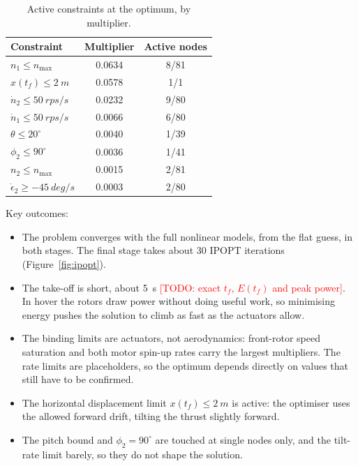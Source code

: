 \documentclass[11pt,a4paper]{article}
\newcommand{\todo}[1]{\textcolor{red}{[TODO: #1]}}
\begin{document}
\begin{table}[h]
\centering\small
\begin{tabular}{@{}lcc@{}}
\toprule
Constraint & Multiplier & Active nodes \\
\midrule
$n_1 \le n_\text{max}$                  & 0.0634   & 8/81 \\
$x(t_f) \le \SI{2}{m}$                  & 0.0578   & 1/1 \\
$\dot n_2 \le \SI{50}{rps/s}$           & 0.0232   & 9/80 \\
$\dot n_1 \le \SI{50}{rps/s}$           & 0.0066   & 6/80 \\
$\theta \le 20^\circ$                   & 0.0040   & 1/39 \\
$\phi_2 \le 90^\circ$                   & 0.0036   & 1/41 \\
$n_2 \le n_\text{max}$                  & 0.0015   & 2/81 \\
$\dot\epsilon_2 \ge -\SI{45}{deg/s}$    & 0.0003   & 2/80 \\
\bottomrule
\end{tabular}
\caption{Active constraints at the optimum, by multiplier.}
\label{tab:active}
\end{table}

Key outcomes:
\begin{itemize}
  \item The problem converges with the full nonlinear models, from the flat guess, in both stages.
        The final stage takes about 30 IPOPT iterations (Figure~\ref{fig:ipopt}).
  \item The take-off is short, about \SI{5}{s} \todo{exact $t_f$, $E(t_f)$ and peak power}.
        In hover the rotors draw power without doing useful work, so minimising energy pushes the
        solution to climb as fast as the actuators allow.
  \item The binding limits are actuators, not aerodynamics: front-rotor speed saturation and both
        motor spin-up rates carry the largest multipliers. The rate limits are placeholders, so the
        optimum depends directly on values that still have to be confirmed.
  \item The horizontal displacement limit $x(t_f) \le \SI{2}{m}$ is active: the optimiser uses the allowed
        forward drift, tilting the thrust slightly forward.
  \item The pitch bound and $\phi_2 = 90^\circ$ are touched at single nodes only, and the tilt-rate limit
        barely, so they do not shape the solution.
\end{itemize}
\end{document}
